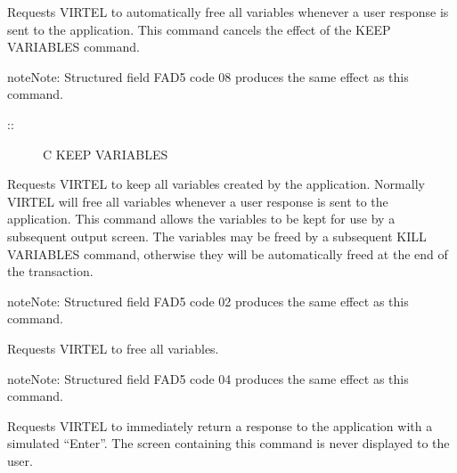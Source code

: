 \documentclass[letterpaper,10pt,english]{sphinxmanual}
\begin{document}
Requests VIRTEL to automatically free all variables whenever a user response is sent to the application. This command
cancels the effect of the KEEP VARIABLES command.

\begin{sphinxadmonition}{note}{Note:}
Structured field FAD5 code 08 produces the same effect as this command.
\end{sphinxadmonition}

\begin{description}
\item[{::}] \leavevmode
C KEEP VARIABLES

\end{description}

Requests VIRTEL to keep all variables created by the application. Normally VIRTEL will free all variables whenever a
user response is sent to the application. This command allows the variables to be kept for use by a subsequent output
screen. The variables may be freed by a subsequent KILL VARIABLES command, otherwise they will be automatically
freed at the end of the transaction.

\begin{sphinxadmonition}{note}{Note:}
Structured field FAD5 code 02 produces the same effect as this command.
\end{sphinxadmonition}


\begin{sphinxVerbatim}[commandchars=\\\{\}]
  
\end{sphinxVerbatim}

Requests VIRTEL to free all variables.

\begin{sphinxadmonition}{note}{Note:}
Structured field FAD5 code 04 produces the same effect as this command.
\end{sphinxadmonition}


\begin{sphinxVerbatim}[commandchars=\\\{\}]
 
\end{sphinxVerbatim}

Requests VIRTEL to immediately return a response to the application with a simulated “Enter”. The screen containing
this command is never displayed to the user.
\end{document}
